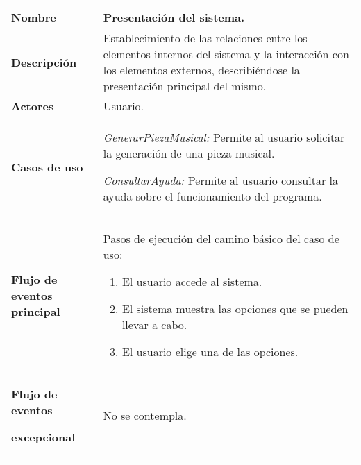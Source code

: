 \begin{longtable}{|>{\columncolor[rgb]{0.75,0.75,0.75}}p{3cm}|p{11cm}|}
\hline \centerline{\textcolor[rgb]{1.00,1.00,1.00}{\textbf{\small Nombre}}} & {\small Presentación del sistema.}
\\
\hline \centerline{\textcolor[rgb]{1.00,1.00,1.00}{\textbf{\small
Descripción}}} & {\small Establecimiento de las relaciones entre los elementos internos del sistema y la interacción con los elementos externos, describiéndose la presentación principal del mismo.}
\\
\hline
\centerline{\textcolor[rgb]{1.00,1.00,1.00}{\textbf{\small
Actores}}}
&
{\small Usuario.}
\\
\hline
\begin{center}
\textcolor[rgb]{1.00,1.00,1.00}{\textbf{\small Casos de uso}}
\end{center}
\begin{center}

\end{center}
&

{\small \emph{GenerarPiezaMusical:} Permite al usuario solicitar la generación de una pieza musical.}

{\small \emph{ConsultarAyuda:} Permite al usuario consultar la ayuda
sobre el funcionamiento del programa.}
\\
\hline
\begin{center}
\end{center}
\begin{center}
\textcolor[rgb]{1.00,1.00,1.00}{\textbf{\small Flujo de eventos
principal}}
\end{center}
&
{\small Pasos de ejecución del camino básico del caso de uso:}

{\small
\begin{enumerate}
    \item El usuario accede al sistema.

    \item El sistema muestra las opciones que se pueden llevar a cabo.

    \item El usuario elige una de las opciones.
\end{enumerate}
}
\\
\hline \centerline{\textcolor[rgb]{1.00,1.00,1.00}{\textbf{\small
Flujo de eventos}}}
\centerline{\textcolor[rgb]{1.00,1.00,1.00}{\textbf{\small
excepcional}}} & {\small No se contempla.}
\\
\hline
\end{longtable}

